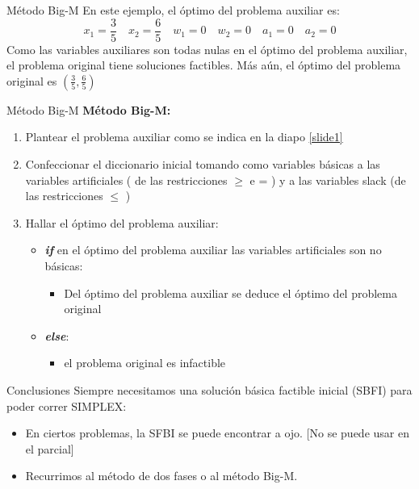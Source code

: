 \documentclass[10pt, aspectratio=169]{beamer}
\begin{document}
    \begin{frame}{Método Big-M}
        En este ejemplo, el óptimo del problema auxiliar es:
        \[ x_1=\frac{3}{5} \quad x_2=\frac{6}{5} \quad w_1=0 \quad w_2=0 \quad a_1=0 \quad a_2 =0 \]
        Como las variables auxiliares son todas nulas en el óptimo del problema auxiliar, el problema original tiene
        soluciones factibles. Más aún, el óptimo del problema original es $(\frac{3}{5}, \frac{6}{5})$
    \end{frame}

    \begin{frame}{Método Big-M}
        \textbf{Método Big-M:}
        \begin{enumerate}
            \item Plantear el problema auxiliar como se indica en la diapo \ref{slide1}
            \item Confeccionar el diccionario inicial tomando como variables básicas a las variables artificiales (
            de las restricciones $\geq$ e = ) y a las variables slack (de las restricciones $\leq$ )
            \item Hallar el óptimo del problema auxiliar:
            \begin{itemize}
                \normalsize
                \item \textbf{\textit{if}} en el óptimo del problema auxiliar las variables artificiales son no básicas:
                \begin{itemize}
                    \normalsize
                    \item[] Del óptimo del problema auxiliar se deduce el óptimo del problema original
                \end{itemize}
                \item \textbf{\textit{else}}:
                \begin{itemize}
                    \normalsize
                    \item[] el problema original es infactible
                \end{itemize}
            \end{itemize}
        \end{enumerate}
    \end{frame}

    \begin{frame}{Conclusiones}
        Siempre necesitamos una solución básica factible inicial (SBFI) para poder correr SIMPLEX:
        \begin{itemize}
            \item En ciertos problemas, la SFBI se puede encontrar a ojo. [No se puede usar en el parcial]
            \item Recurrimos al método de dos fases o al método Big-M.
        \end{itemize}
    \end{frame}
\end{document}
